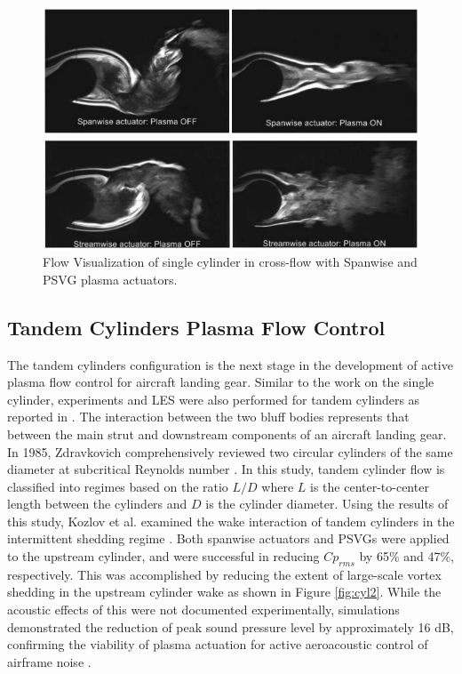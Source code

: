 \begin{figure}
	\begin{center}
		\centerline{\includegraphics[scale=1.0]{figures/single_span.pdf}}
		\centerline{\includegraphics[scale=1.0]{figures/single_psvg.pdf}}
		\caption{Flow Visualization of single cylinder in cross-flow with Spanwise and PSVG plasma actuators.}
		\label{fig:cyl1}
	\end{center}
\end{figure}


\subsection{Tandem Cylinders Plasma Flow Control}

The tandem cylinders configuration is the next stage in the development of active plasma flow control for aircraft landing gear. Similar to the work on the single cylinder, experiments and LES were also performed for tandem cylinders as reported in \cite{eltaweel2014} \cite{khorrami2005} \cite{kozlov20112}. The interaction between the two bluff bodies represents that between the main strut and downstream components of an aircraft landing gear. In 1985, Zdravkovich comprehensively reviewed two circular cylinders of the same diameter at subcritical Reynolds number \cite{zdravkovich1985}. In this study, tandem cylinder flow is classified into regimes based on the ratio $L/D$ where $L$ is the center-to-center length between the cylinders and $D$ is the cylinder diameter. Using the results of this study, Kozlov et al. examined the wake interaction of tandem cylinders in the intermittent shedding regime \cite{kozlov20112}. Both spanwise actuators and PSVGs were applied to the upstream cylinder, and were successful in reducing $Cp_{rms}$ by 65\% and 47\%, respectively. This was accomplished by reducing the extent of large-scale vortex shedding in the upstream cylinder wake as shown in Figure \ref{fig:cyl2}. While the acoustic effects of this were not documented experimentally, simulations demonstrated the reduction of peak sound pressure level by approximately 16 dB, confirming the viability of plasma actuation for active aeroacoustic control of airframe noise \cite{eltaweel2014}.

